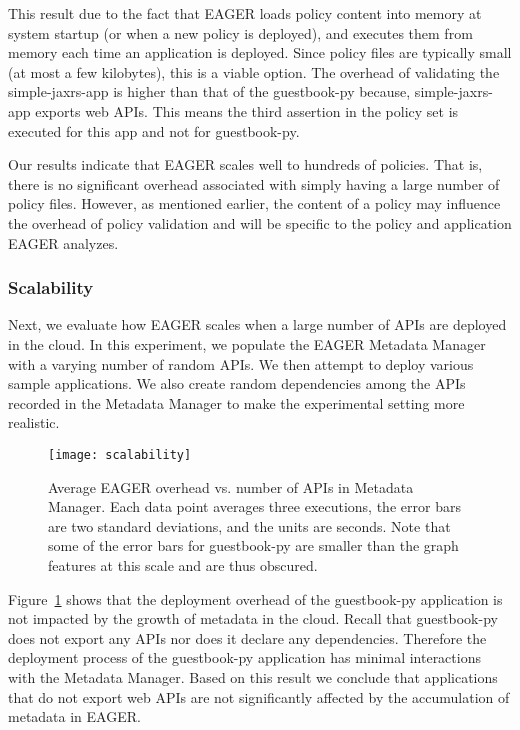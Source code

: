 This result due to the fact that EAGER loads policy content into memory at system
startup (or when a new policy is deployed), and executes them from memory each
time an application is deployed. Since policy files are typically small (at
most a few kilobytes), this is a viable option. The overhead of validating the
simple-jaxrs-app is higher than that of the guestbook-py because,
simple-jaxrs-app exports web APIs. This means the third assertion in the
policy set is executed for this app and not for guestbook-py. 

Our results indicate that EAGER scales well to hundreds of policies. That is,
there is no significant overhead associated with simply having a large number
of policy files. However, as mentioned earlier, the content of a policy may
influence the overhead of policy validation and will be specific to the policy and 
application EAGER analyzes.
 
\subsubsection{Scalability}
Next, we evaluate how EAGER scales when a large number of APIs are deployed 
in the cloud. In this experiment, we populate the EAGER
Metadata Manager with a varying number of random APIs. We then attempt to deploy various sample 
applications. We also create random dependencies among the APIs recorded in the 
Metadata Manager to make the experimental setting more realistic.

\begin{figure}
\centering
\texttt{[image: scalability]}
\caption{Average EAGER overhead vs. number of APIs in Metadata Manager.  Each
data point averages three executions, the error bars are two standard
deviations, and the units are seconds.  Note that some of the error bars for
guestbook-py are smaller than the graph features at this scale and are thus obscured.}
\label{fig:scalability}
\vspace{-0.2in}
\end{figure}

Figure~\ref{fig:scalability} shows that the deployment overhead of the 
guestbook-py application is not impacted by the growth of metadata
in the cloud. Recall that guestbook-py does not export any APIs nor does it 
declare any dependencies. Therefore the deployment process of
the guestbook-py application has minimal interactions with the 
Metadata Manager. Based on this result we conclude that applications that
do not export web APIs are not significantly affected by the accumulation 
of metadata in EAGER.

